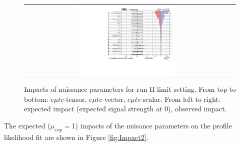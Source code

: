 \begin{figure}[tbh!]
\begin{center}
\begin{tabular}{cc}
  \includegraphics[width=0.48\textwidth]{figures/Appendix/Impact/Impact_ScalarC}\\
 \end{tabular}
 \caption{Impacts of nuissance parameters for run II limit setting. From top to bottom: $e\mu tc$-tensor, $e\mu tc$-vector, $e\mu tc$-scalar. From left to right: expected impact (expected signal strength at 0), observed impact.}
 \label{fig:Impact1}
 \end{center}
\end{figure}

The expected ($\mu_{exp}=$1) impacts of the nuisance parameters on the profile likelihood fit are shown in Figure \ref{fig:Impact2}.

